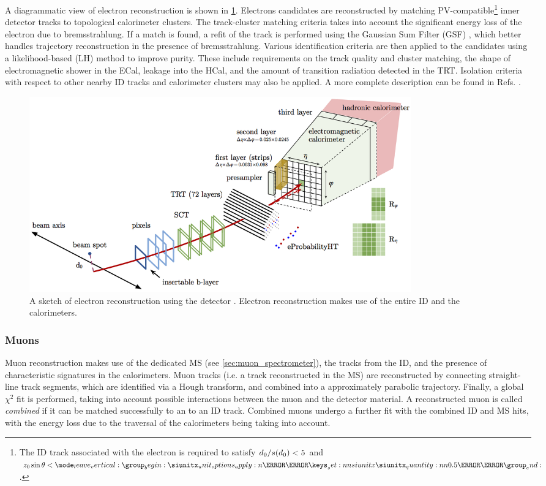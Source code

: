 A diagrammatic view of electron reconstruction is shown in \cref{fig:electron_Reco}.
Electrons candidates are reconstructed by matching PV-compatible\footnote{The ID track associated with the electron is required to satisfy $d_{0} / s(d_0) < 5$ and $\zzero\sin\theta < \SI{0.5}{\milli\meter}$.} inner detector tracks to topological calorimeter clusters.
The track-cluster matching criteria takes into account the significant energy loss of the electron due to bremsstrahlung.
If a match is found, a refit of the track is performed using the Gaussian Sum Filter (GSF) \cite{ATLAS-CONF-2012-047}, which better handles trajectory reconstruction in the presence of bremsstrahlung.
Various identification criteria are then applied to the candidates using a likelihood-based (LH) method to improve purity.
These include requirements on the track quality and cluster matching, the shape of electromagnetic shower in the ECal, leakage into the HCal, and the amount of transition radiation detected in the TRT.
Isolation criteria with respect to other nearby ID tracks and calorimeter clusters may also be applied.
A more complete description can be found in Refs. \cite{ATL-PHYS-PUB-2017-022,EGAM-2018-01}.
%
\begin{figure}[!htbp]
  \centering
  \includegraphics[width=0.8\textwidth]{chapters/2.detector/figs/electron_reco.png}
  \caption{
    A sketch of electron reconstruction using the \ATLAS detector \cite{ATLAS-CONF-2016-024}.
    Electron reconstruction makes use of the entire ID and the calorimeters.
  }
  \label{fig:electron_Reco}
\end{figure}
%


\subsubsection{Muons}
Muon reconstruction makes use of the dedicated MS (see \cref{sec:muon_spectrometer}), the tracks from the ID, and the presence of characteristic signatures in the calorimeters.
Muon tracks (i.e. a track reconstructed in the MS) are reconstructed by connecting straight-line track segments, which are identified via a Hough transform, and combined into a approximately parabolic trajectory.
Finally, a global $\chi^2$ fit is performed, taking into account possible interactions between the muon and the detector material.
A reconstructed muon is called \textit{combined} if it can be matched successfully to an to an ID track.
Combined muons undergo a further fit with the combined ID and MS hits, with the energy loss due to the traversal of the calorimeters being taking into account.

